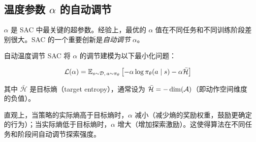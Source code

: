 \subsection{温度参数 $\alpha$ 的自动调节}

$\alpha$ 是 SAC 中最关键的超参数。经验上，最优的 $\alpha$ 值在不同任务和不同训练阶段差别很大。SAC 的一个重要创新是\emph{自动调节} $\alpha$。

\begin{mydefinition}{自动温度调节}
SAC 将 $\alpha$ 的调节建模为以下最小化问题：

\[
\mathcal{L}(\alpha) = \mathbb{E}_{s \sim \mathcal{D},\, a \sim \pi_\theta} \left[ -\alpha \log \pi_\theta(a \mid s) - \alpha \bar{\mathcal{H}} \right]
\]

其中 $\bar{\mathcal{H}}$ 是目标熵（target entropy），通常设为 $\bar{\mathcal{H}} = -\dim(\mathcal{A})$（即动作空间维度的负值）。
\end{mydefinition}

直观上，当策略的实际熵高于目标熵时，$\alpha$ 减小（减少熵的奖励权重，鼓励更确定的行为）；当实际熵低于目标熵时，$\alpha$ 增大（增加探索激励）。这使得算法在不同任务和阶段间自动调节探索强度。

